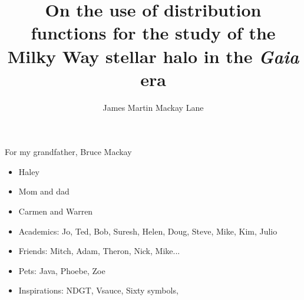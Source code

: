 \documentclass{ut-thesis}
\author{James Martin Mackay Lane}
\title{On the use of distribution functions for the study of the Milky Way stellar halo in the \textit{Gaia} era}
\begin{document}
\frontmatter
\maketitle

\begin{abstract}
    
\end{abstract}

\begin{dedication}
    For my grandfather, Bruce Mackay
\end{dedication}

\begin{acknowledgements}
    \begin{itemize}
        \item Haley
        \item Mom and dad
        \item Carmen and Warren
        \item Academics: Jo, Ted, Bob, Suresh, Helen, Doug, Steve, Mike, Kim, Julio
        \item Friends: Mitch, Adam, Theron, Nick, Mike...
        \item Pets: Java, Phoebe, Zoe
        \item Inspirations: NDGT, Vsauce, Sixty symbols, 
    \end{itemize}
\end{acknowledgements}

\tableofcontents
\listoftables
\listoffigures

\mainmatter




% 







\appendix

\backmatter
\printbibliography[heading=bibintoc]

\end{document}
